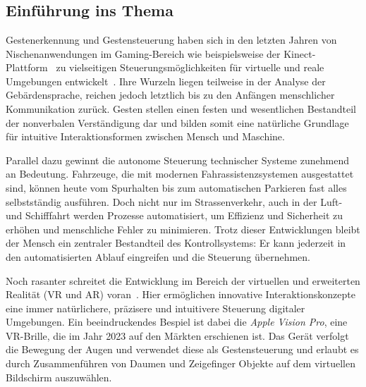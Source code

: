\chapter{\chapOne}
\label{cha:chapter1} %

\begingroup
\fontsize{12pt}{14pt}\selectfont

\section{Einführung ins Thema}
Gestenerkennung und Gestensteuerung haben sich in den letzten Jahren von Nischenanwendungen im Gaming-Bereich wie beispielsweise der Kinect-Plattform~\cite{Wiki:Kinect} zu vielseitigen Steuerungsmöglichkeiten für virtuelle und reale Umgebungen entwickelt~\cite{RG:GestureRecognition}.
Ihre Wurzeln liegen teilweise in der Analyse der Gebärdensprache, reichen jedoch letztlich bis zu den Anfängen menschlicher Kommunikation zurück.\cite{Wiki:Gestenerkennung}\cite{RG:Gesten}
Gesten stellen einen festen und wesentlichen Bestandteil der nonverbalen Verständigung dar und bilden somit eine natürliche Grundlage für intuitive Interaktionsformen zwischen Mensch und Maschine.\cite[10]{Hobmair:Psy}

Parallel dazu gewinnt die autonome Steuerung technischer Systeme zunehmend an Bedeutung.
Fahrzeuge, die mit modernen Fahrassistenzsystemen ausgestattet sind, können heute vom Spurhalten bis zum automatischen Parkieren fast alles selbstständig ausführen.
Doch nicht nur im Strassenverkehr, auch in der Luft- und Schifffahrt werden Prozesse automatisiert, um Effizienz und Sicherheit zu erhöhen und menschliche Fehler zu minimieren.
Trotz dieser Entwicklungen bleibt der Mensch ein zentraler Bestandteil des Kontrollsystems: Er kann jederzeit in den automatisierten Ablauf eingreifen und die Steuerung übernehmen.\cite{Wiki:aupi}

Noch rasanter schreitet die Entwicklung im Bereich der virtuellen und erweiterten Realität (VR und AR) voran~\cite{SD:VR}.
Hier ermöglichen innovative Interaktionskonzepte eine immer natürlichere, präzisere und intuitivere Steuerung digitaler Umgebungen.
Ein beeindruckendes Bespiel ist dabei die \textit{Apple Vision Pro}, eine VR-Brille, die im Jahr 2023 auf den Märkten erschienen ist.
Das Gerät verfolgt die Bewegung der Augen und verwendet diese als Gestensteuerung und erlaubt es durch Zusammenführen von Daumen und Zeigefinger Objekte auf dem virtuellen Bildschirm auszuwählen.\cite{apl:vision}

